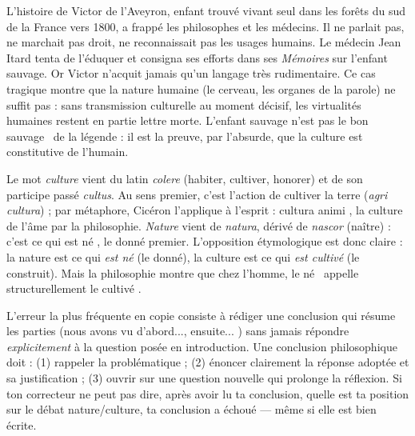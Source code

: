 \documentclass[11pt]{article}
\begin{document}
\begin{exemplebox}
L'histoire de Victor de l'Aveyron, enfant trouvé vivant seul dans les forêts du sud de la France vers 1800, a frappé les philosophes et les médecins. Il ne parlait pas, ne marchait pas droit, ne reconnaissait pas les usages humains. Le médecin Jean Itard tenta de l'éduquer et consigna ses efforts dans ses \emph{Mémoires} sur l'enfant sauvage. Or Victor n'acquit jamais qu'un langage très rudimentaire. Ce cas tragique montre que la nature humaine (le cerveau, les organes de la parole) ne suffit pas : sans transmission culturelle au moment décisif, les virtualités humaines restent en partie lettre morte. L'enfant sauvage n'est pas le \guillemotleft bon sauvage \guillemotright\ de la légende : il est la preuve, par l'absurde, que la culture est constitutive de l'humain.
\end{exemplebox}

\begin{savaistu}
Le mot \emph{culture} vient du latin \emph{colere} (habiter, cultiver, honorer) et de son participe passé \emph{cultus}. Au sens premier, c'est l'action de cultiver la terre (\emph{agri cultura}) ; par métaphore, Cicéron l'applique à l'esprit : \guillemotleft cultura animi \guillemotright, la culture de l'âme par la philosophie. \emph{Nature} vient de \emph{natura}, dérivé de \emph{nascor} (naître) : c'est ce qui est \guillemotleft né \guillemotright, le donné premier. L'opposition étymologique est donc claire : la nature est ce qui \emph{est né} (le donné), la culture est ce qui \emph{est cultivé} (le construit). Mais la philosophie montre que chez l'homme, le \guillemotleft né \guillemotright\ appelle structurellement le \guillemotleft cultivé \guillemotright.
\end{savaistu}

\begin{attention}
L'erreur la plus fréquente en copie consiste à rédiger une conclusion qui résume les parties (\guillemotleft nous avons vu d'abord..., ensuite... \guillemotright) sans jamais répondre \emph{explicitement} à la question posée en introduction. Une conclusion philosophique doit : (1) rappeler la problématique ; (2) énoncer clairement la réponse adoptée et sa justification ; (3) ouvrir sur une question nouvelle qui prolonge la réflexion. Si ton correcteur ne peut pas dire, après avoir lu ta conclusion, quelle est ta position sur le débat nature/culture, ta conclusion a échoué — même si elle est bien écrite.
\end{attention}
\end{document}
